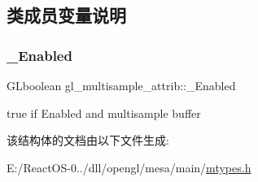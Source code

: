 \subsection{类成员变量说明}
\mbox{\label{structgl__multisample__attrib_a68ee7b2141cb4e6c18eefe01bc04026c}} 
\subsubsection{\texorpdfstring{\+\_\+\+Enabled}{\_Enabled}}
{\footnotesize\ttfamily G\+Lboolean gl\+\_\+multisample\+\_\+attrib\+::\+\_\+\+Enabled}

true if Enabled and multisample buffer 

该结构体的文档由以下文件生成\+:\begin{DoxyCompactItemize}
\item 
E\+:/\+React\+O\+S-\/0../dll/opengl/mesa/main/\hyperlink{mtypes_8h}{mtypes.\+h}\end{DoxyCompactItemize}

